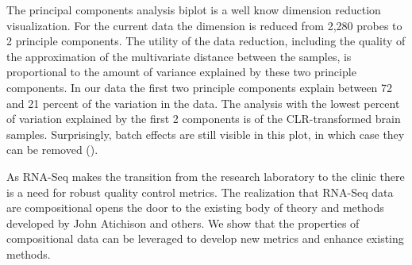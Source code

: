 \documentclass [10pt]{article}
\theoremstyle{definition}
\begin{document}
The principal components analysis biplot is a well know dimension reduction visualization.  For the current data the dimension is reduced from 2,280 probes to 2 principle components.  The utility of the data reduction, including the quality of the approximation of the multivariate distance between the samples, is proportional to the amount of variance explained by these two principle components. In our data the first two principle components explain between 72 and 21 percent of the variation in the data.  The analysis with the lowest percent of variation explained by the first 2 components is of the CLR-transformed brain samples.  Surprisingly, batch effects are still visible in this plot, in which case they can be removed (\cite{Luo2010}).  

As RNA-Seq makes the transition from the research laboratory to the clinic there is a need for robust quality control metrics.  The realization that RNA-Seq data are compositional opens the door to the existing body of theory and methods developed by John Atichison and others.  We show that the properties of compositional data can be leveraged to develop new metrics and enhance existing methods.


\newpage

\end{document}
